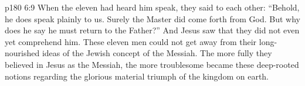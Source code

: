 \vs p180 6:9 When the eleven had heard him speak, they said to each other: “Behold, he does speak plainly to us. Surely the Master did come forth from God. But why does he say he must return to the Father?” And Jesus saw that they did not even yet comprehend him. These eleven men could not get away from their long\hyp{}nourished ideas of the Jewish concept of the Messiah. The more fully they believed in Jesus as the Messiah, the more troublesome became these deep\hyp{}rooted notions regarding the glorious material triumph of the kingdom on earth.
\quizlink
